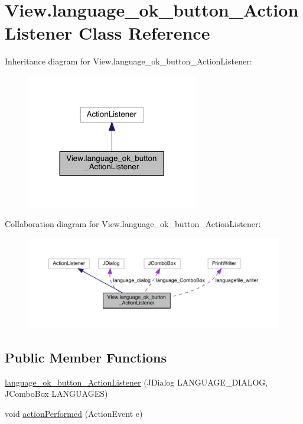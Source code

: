 \hypertarget{class_view_1_1language__ok__button___action_listener}{}\section{View.\+language\+\_\+ok\+\_\+button\+\_\+\+Action\+Listener Class Reference}
\label{class_view_1_1language__ok__button___action_listener}


Inheritance diagram for View.\+language\+\_\+ok\+\_\+button\+\_\+\+Action\+Listener\+:
\nopagebreak
\begin{figure}[H]
\begin{center}
\leavevmode
\includegraphics[width=212pt]{class_view_1_1language__ok__button___action_listener__inherit__graph}
\end{center}
\end{figure}


Collaboration diagram for View.\+language\+\_\+ok\+\_\+button\+\_\+\+Action\+Listener\+:
\nopagebreak
\begin{figure}[H]
\begin{center}
\leavevmode
\includegraphics[width=350pt]{class_view_1_1language__ok__button___action_listener__coll__graph}
\end{center}
\end{figure}
\subsection*{Public Member Functions}
\begin{DoxyCompactItemize}
\item 
\hyperlink{class_view_1_1language__ok__button___action_listener_a931f80563c8f60ff10dc9625c07c411c}{language\+\_\+ok\+\_\+button\+\_\+\+Action\+Listener} (J\+Dialog L\+A\+N\+G\+U\+A\+G\+E\+\_\+\+D\+I\+A\+L\+O\+G, J\+Combo\+Box L\+A\+N\+G\+U\+A\+G\+E\+S)
\item 
void \hyperlink{class_view_1_1language__ok__button___action_listener_ada7e62d62dab938000721f09419328a6}{action\+Performed} (Action\+Event e)
\end{DoxyCompactItemize}


